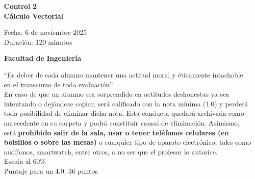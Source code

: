 \documentclass[a4paper]{article}
\begin{document}
\thispagestyle{fancy}
\vspace*{1cm}

\begin{minipage}[r]{12cm}
    \begin{flushright}
    \end{flushright}
\end{minipage}

\begin{center}
\Large{\textbf{Control 2\\ Cálculo Vectorial\\ }}
\end{center}
\vspace{1cm}
\begin{minipage}[r]{15cm}
\begin{flushleft}

Fecha: 6 de noviembre 2025 \\%
Duración: 120 minutos  \\
\end{flushleft}
\end{minipage}
\vspace{2cm}
\begin{center}
\Large{\textbf{Facultad de Ingeniería}}
\end{center}
\vspace{1cm}
\setlength{\parindent}{0cm}
“Es deber de cada alumno mantener una actitud moral y éticamente intachable en el transcurso de toda evaluación” \\

En caso de que un alumno sea sorprendido en actitudes deshonestas ya sea intentando o
dejándose copiar, será calificado con la nota mínima (1.0) y perderá toda posibilidad de
eliminar dicha nota. Esta conducta quedará archivada como antecedente en su carpeta y podrá
constituir causal de eliminación. Asimismo, está \textbf{prohibido salir de la sala, usar o tener
teléfonos celulares (en bolsillos o sobre las mesas)} o cualquier tipo de aparato electrónico,
tales como audífonos, smartwatch, entre otros, a no ser que el profesor lo autorice.\\


Escala al $60\%$ \\

Puntaje para un 4.0: 36 puntos


\vspace{3cm}
\newpage
\thispagestyle{empty}
\end{document}
